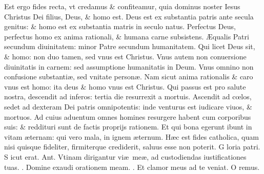 \documentclass[a5paper,10pt]{book}
\makeatletter
\DeclareRobustCommand{\Vbar}{\vers@resp{-0.1em}{V}}
\DeclareRobustCommand{\Rbar}{\vers@resp{0pt}{R}}
\newcommand{\vers@resp@sym}{\raisebox{0.2ex}{\rotatebox[origin=c]{-20}{$\m@th\rceil$}}}
\newcommand{\vers@resp}[2]{%
  {\ooalign{\hidewidth\kern#1\vers@resp@sym\hidewidth\cr#2\cr}}%
}%
\def\ae{æ}
\def\AE{Æ}
\def\oe{œ}
\makeatother
\begin{document}
\begin{multicols*}{2}
\newline \color{red} E\color{black}st ergo fides recta, vt credamus \& confiteamur, quia dominus noster Iesus Christus Dei filius, Deus, \& homo est.
\newline \color{red} D\color{black}eus est ex substantia patris ante secula genitus: \& homo est ex substantia matris in seculo natus.
\newline \color{red} P\color{black}erfectus Deus, perfectus homo ex anima rationali, \& humana carne subsistens.
\newline \color{red} \AE \color{black}qualis Patri secundum diuinitatem: minor Patre secundum humanitatem.
\newline \color{red} Q\color{black}ui licet Deus sit, \& homo: non duo tamen, sed vnus est Christus.
\newline \color{red} V\color{black}nus autem non conuersione diuinitatis in carnem: sed assumptione humanitatis in Deum.
\newline \color{red} V\color{black}nus omnino non confusione substanti\ae , sed vnitate person\ae .
\newline \color{red} N\color{black}am sicut anima rationalis \& caro vnus est homo: ita deus \& homo vnus est Christus.
\newline \color{red} Q\color{black}ui passus est pro salute nostra, descendit ad inferos: tertia die resurrexit a mortuis.
\newline \color{red} A\color{black}scendit ad c\oe los, sedet ad dexteram Dei patris omnipotentis: inde venturus est iudicare viuos, \& mortuos.
\newline \color{red} A\color{black}d cuius aduentum omnes homines resurgere habent cum corporibus suis: \& reddituri sunt de factis proprijs rationem.
\newline \color{red} E\color{black}t qui bona egerunt ibunt in vitam \ae ternam: qui vero mala, in ignem \ae ternum.
\newline \color{red} H\color{black}\ae c est fides catholica, quam nisi quisque fideliter, firmiterque crediderit, saluus esse non poterit.
\newline \color{red} G\color{black} loria patri. \color{red} S\color{black} icut erat. \color{red} Ant. \color{black} Vtinam dirigantur vi\ae \ me\ae , ad custodiendas iustificationes tuas. \color{red} \Vbar . \color{black} Domine exaudi orationem meam. \color{red} \Rbar . \color{black} Et clamor meus ad te veniat. \quad \color{red} O\color{black} remus.

\end{multicols*}
\end{document}
